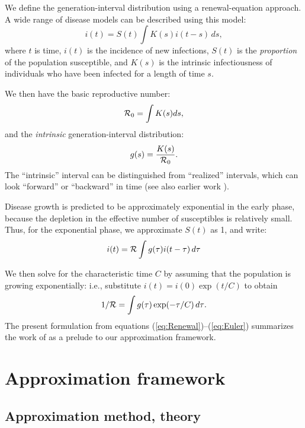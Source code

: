 \documentclass[12pt,]{article}
\newcommand{\RR}{\ensuremath{{\cal R}}}
\newcommand{\Rx}[1]{\ensuremath{{\cal R}_{#1}}}
\newcommand{\Ro}{\Rx{0}}
\newcommand{\Tc}{\ensuremath{C}}
\newcommand{\eref}[1]{(\ref{eq:#1})}
\begin{document}
We define the generation-interval distribution using a renewal-equation approach.
A wide range of disease models can be described using this model: 
\begin{equation}
i(t) = S(t)\int{K(s)i(t-s) \,ds},
\label{eq:Renewal}
\end{equation}
where $t$ is time, $i(t)$ is the incidence of new infections, $S(t)$ is the \emph{proportion} of the population susceptible, and $K(s)$ is the intrinsic infectiousness of individuals who have been infected for a length of time $s$.

We then have the basic reproductive number: 
\begin{equation}
\Ro = \int{K(s)ds},
\end{equation}
and the \emph{intrinsic} generation-interval distribution:
\begin{equation}
g(s) = \frac{K(s)}{\Ro}.
\end{equation}
The ``intrinsic'' interval can be distinguished from ``realized'' intervals, which can look ``forward'' or ``backward'' in time \cite{ChamDush15} (see also earlier work \cite{Sven07,Nish10}).

Disease growth is predicted to be approximately exponential in the early phase, because the depletion in the effective number of susceptibles is relatively small.
Thus, for the exponential phase, we approximate $S(t)$ as 1, and write:
\begin{equation}
i(t) = \RR\int{g(\tau)i(t-\tau) \,d\tau}
\end{equation}

We then solve for the characteristic time $\Tc$ by assuming that the population is growing exponentially: i.e., substitute $i(t) = i(0) \exp(t/\Tc)$ to obtain
\begin{equation}
	1/\RR = \int{g(\tau)\exp(-\tau/\Tc) \,d\tau}.\label{eq:Euler}
\end{equation}
The present formulation from equations \eref{Renewal}--\eref{Euler} summarizes the work of \cite{WallLips07} as a prelude to our approximation framework.

\section{Approximation framework}

\subsection{Approximation method, theory}
\end{document}
